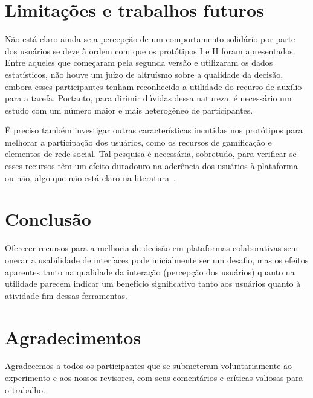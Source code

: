 \documentclass{sigchi}
\begin{document}
\section{Limitações e trabalhos futuros}
Não está claro ainda se a percepção de um comportamento solidário por parte dos usuários se deve à ordem com que os protótipos I e II foram apresentados. Entre aqueles que começaram pela segunda versão e utilizaram os dados estatísticos, não houve um juízo de altruísmo sobre a qualidade da decisão, embora esses participantes tenham reconhecido a utilidade do recurso de auxílio para a tarefa. Portanto, para dirimir dúvidas dessa natureza, é necessário um estudo com um número maior e mais heterogêneo de participantes.

É preciso também investigar outras características incutidas nos protótipos para melhorar a participação dos usuários, como os recursos de gamificação e elementos de rede social. Tal pesquisa é necessária, sobretudo, para verificar se esses recursos têm um efeito duradouro na aderência dos usuários à plataforma ou não, algo que não está claro na literatura~\cite{hamari:2014}.


\section{Conclusão}
Oferecer recursos para a melhoria de decisão em plataformas colaborativas sem onerar a usabilidade de interfaces pode inicialmente ser um desafio, mas os efeitos aparentes tanto na qualidade da interação (percepção dos usuários) quanto na utilidade parecem indicar um benefício significativo tanto aos usuários quanto à atividade-fim dessas ferramentas.


\section{Agradecimentos}

Agradecemos a todos os participantes que se submeteram voluntariamente ao experimento e aos nossos revisores, com seus comentários e críticas valiosas para o trabalho.


\balance{}


\balance{}



\end{document}
